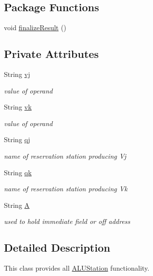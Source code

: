\subsection*{\-Package \-Functions}
\begin{DoxyCompactItemize}
\item 
void \hyperlink{classALUStation_a07849653d1e2bc771def80de30ab24f2}{finalize\-Result} ()
\end{DoxyCompactItemize}
\subsection*{\-Private \-Attributes}
\begin{DoxyCompactItemize}
\item 
\-String \hyperlink{classALUStation_a1b7e9688731461f02ed6dba04f2c367b}{vj}
\begin{DoxyCompactList}\small\item\em value of operand \end{DoxyCompactList}\item 
\-String \hyperlink{classALUStation_aa9807e1058e78381d0682338bbf241fe}{vk}
\begin{DoxyCompactList}\small\item\em value of operand \end{DoxyCompactList}\item 
\-String \hyperlink{classALUStation_ad4f9bb91cc8aea34e2820692b053a6b9}{qj}
\begin{DoxyCompactList}\small\item\em name of reservation station producing \-Vj \end{DoxyCompactList}\item 
\-String \hyperlink{classALUStation_a4f5501e1bb07e37c0bfc884f6f19fdfa}{qk}
\begin{DoxyCompactList}\small\item\em name of reservation station producing \-Vk \end{DoxyCompactList}\item 
\-String \hyperlink{classALUStation_a8f2c76f7cdf676b26a20457f657d6083}{\-A}
\begin{DoxyCompactList}\small\item\em used to hold immediate field or off address \end{DoxyCompactList}\end{DoxyCompactItemize}


\subsection{\-Detailed \-Description}
\-This class provides all \hyperlink{classALUStation}{\-A\-L\-U\-Station} functionality. 


